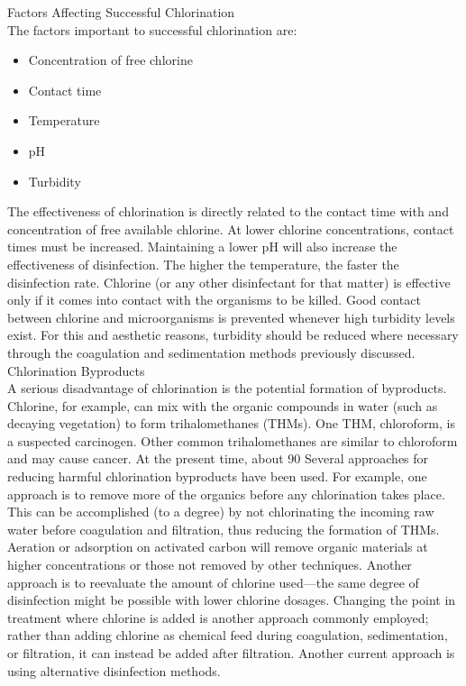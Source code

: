 \documentclass{article}
\begin{document}
Factors Affecting Successful Chlorination\\
The factors important to successful chlorination are:
\begin{itemize}
\item Concentration of free chlorine
\item Contact time
\item Temperature
\item pH
\item Turbidity
\end{itemize}
The effectiveness of chlorination is directly related to the contact time with and concentration of free available chlorine. At lower chlorine concentrations, contact times must be increased. Maintaining a lower pH will also increase the effectiveness of disinfection. The higher the temperature, the faster the disinfection rate. Chlorine (or any other disinfectant for that matter) is effective only if it comes into contact with the organisms to be killed. Good contact between chlorine and microorganisms is prevented whenever high turbidity levels exist. For this and aesthetic reasons, turbidity should be reduced where necessary through the coagulation and sedimentation methods previously discussed.\\
Chlorination Byproducts\\
A serious disadvantage of chlorination is the potential formation of byproducts. Chlorine, for example, can mix with the organic compounds in water (such as decaying vegetation) to form trihalomethanes (THMs). One THM, chloroform, is a suspected carcinogen. Other common trihalomethanes are similar to chloroform and may cause cancer.
At the present time, about 90%
Several approaches for reducing harmful chlorination byproducts have been used. For example, one approach is to remove more of the organics before any chlorination takes place. This can be accomplished (to a degree) by not chlorinating the incoming
raw water before coagulation and filtration, thus reducing the formation of THMs. Aeration or adsorption on activated carbon will remove organic materials at higher concentrations or those not removed by other techniques. Another approach is to reevaluate the amount of chlorine used—the same degree of disinfection might be possible with lower chlorine dosages. Changing the point in treatment where chlorine is added is another approach commonly employed; rather than adding chlorine as chemical feed during coagulation, sedimentation, or filtration, it can instead be added after filtration. Another current approach is using alternative disinfection methods.\\
\end{document}
